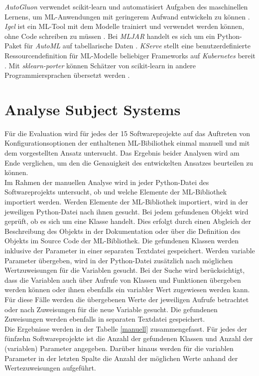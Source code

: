 \documentclass[german,bachelor]{swsLeipzig}
\begin{document}
\textit{AutoGluon} verwendet scikit-learn und automatisiert Aufgaben des maschinellen Lernens, um ML-Anwendungen mit geringerem
Aufwand entwickeln zu können \cite[]{agtabular}.
\textit{Igel} ist ein ML-Tool mit dem Modelle trainiert und verwendet werden können, ohne Code schreiben zu müssen \cite[]{igel}.
Bei \textit{MLJAR} handelt es sich um ein Python-Paket für \textit{AutoML} auf tabellarische Daten \cite[]{mljar}.
\textit{KServe} stellt eine benutzerdefinierte Ressourcendefinition für ML-Modelle beliebiger Frameworks
auf \textit{Kubernetes} bereit \cite[]{KServe}.
Mit \textit{sklearn-porter} können Schätzer von scikit-learn in andere Programmiersprachen übersetzt werden \cite[]{sklearn_porter}.

\section{Analyse Subject Systems}
Für die Evaluation wird für jedes der 15 Softwareprojekte auf das Auftreten von Konfigurationsoptionen der enthaltenen ML-Bibiliothek
einmal manuell und mit dem vorgestellten Ansatz untersucht.
Das Ergebnis beider Analysen wird am Ende verglichen, um den die Genauigkeit des entwickelten Ansatzes beurteilen zu können.\\

Im Rahmen der manuellen Analyse wird in jeder Python-Datei des Softwareprojekts untersucht, ob und welche Elemente der ML-Bibliothek
importiert werden.
Werden Elemente der ML-Bibliothek importiert, wird in der jeweiligen Python-Datei nach ihnen gesucht.
Bei jedem gefundenen Objekt wird geprüft, ob es sich um eine Klasse handelt.
Dies erfolgt durch einen Abgleich der Beschreibung des Objekts in der Dokumentation oder
über die Definition des Objekts im Source Code der ML-Bibliothek.
Die gefundenen Klassen werden inklusive der Parameter in einer separaten Textdatei gespeichert.
Werden variable Parameter übergeben, wird in der Python-Datei zusätzlich nach möglichen Wertzuweisungen für die Variablen gesucht.
Bei der Suche wird berücksichtigt, dass die Variablen auch über Aufrufe von Klassen und Funktionen übergeben werden können oder ihnen ebenfalls ein
variabler Wert zugewiesen werden kann.
Für diese Fälle werden die übergebenen Werte der jeweiligen Aufrufe betrachtet oder nach Zuweisungen für die neue Variable gesucht.
Die gefundenen Zuweisungen werden ebenfalls in separaten Textdatei gespeichert.\\

Die Ergebnisse werden in der Tabelle \ref{manuell} zusammengefasst.
Für jedes der fünfzehn Softwareprojekte ist die Anzahl der gefundenen Klassen und Anzahl der
(variablen) Parameter angegeben.
Darüber hinaus werden für die variablen Parameter in der letzten Spalte die Anzahl der möglichen Werte anhand
der Wertezuweisungen aufgeführt.
\end{document}
